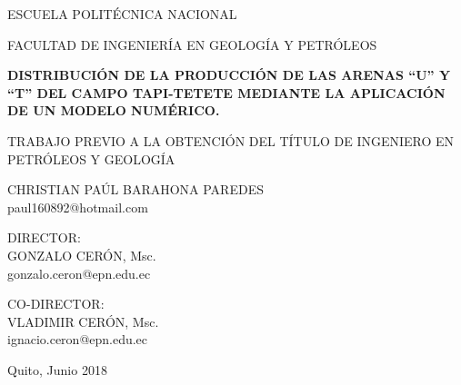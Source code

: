 \documentclass[a4paper,openright,12pt]{report}
\begin{document}
\begin{titlepage}
\begin{center}
\vspace*{-1in}
\begin{figure}[htb]
\begin{center}

\end{center}
\end{figure}
\begin{Large}
ESCUELA POLITÉCNICA NACIONAL\\
\end{Large}
\vspace*{2.3 cm}
\begin{Large}
FACULTAD DE INGENIERÍA EN GEOLOGÍA Y PETRÓLEOS\\
\end{Large}
\vspace*{2.3 cm}
\begin{Large}
\textbf{DISTRIBUCIÓN DE LA PRODUCCIÓN DE LAS ARENAS ``U'' Y ``T'' DEL CAMPO TAPI-TETETE MEDIANTE LA APLICACIÓN DE UN MODELO NUMÉRICO.} \\
\end{Large}
\vspace*{2.2 cm}

\begin{large}
TRABAJO PREVIO A LA OBTENCIÓN DEL TÍTULO DE INGENIERO EN PETRÓLEOS Y GEOLOGÍA \\
\end{large}
\vspace*{2 cm}
\begin{large}
CHRISTIAN PAÚL BARAHONA PAREDES \\ [0.45 cm]
paul160892@hotmail.com\\
\end{large}
\vspace*{1.4 cm}
\begin{large}
DIRECTOR:  \\
GONZALO CERÓN, Msc. \\ [0.4 cm]
gonzalo.ceron@epn.edu.ec \\[1.4 cm]
\end{large}
\begin{large}
CO-DIRECTOR:  \\
VLADIMIR CERÓN, Msc. \\ [0.4 cm]
ignacio.ceron@epn.edu.ec\\[0.4 cm]
\end{large}
\begin{large}
Quito, Junio 2018\\ [1.4 cm]
\end{large}
\end{center}
\end{titlepage}
\end{document}

